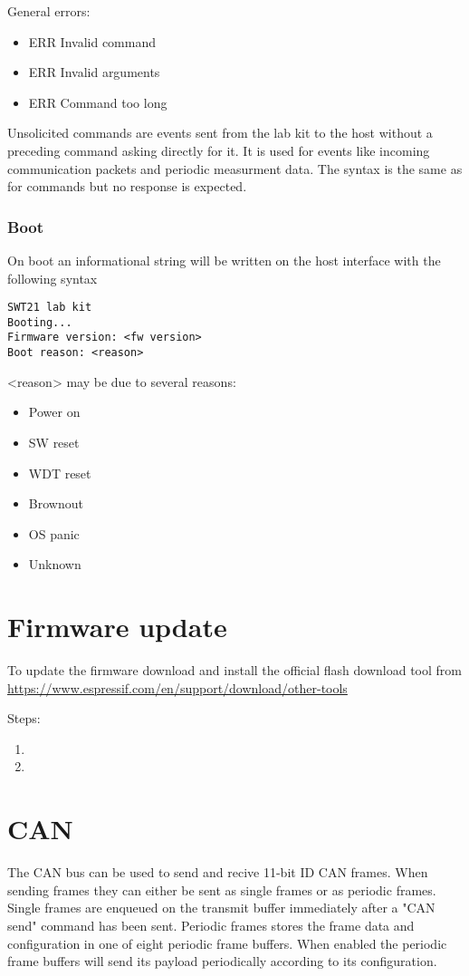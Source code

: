 \documentclass{article}[a4paper]
\begin{document}
General errors:
\begin{itemize}[noitemsep]
\item ERR Invalid command
\item ERR Invalid arguments
\item ERR Command too long
\end{itemize}

Unsolicited commands are events sent from the lab kit to the host without a
preceding command asking directly for it. It is used for events like incoming
communication packets and periodic measurment data. The syntax is the same as
for commands but no response is expected.

\subsubsection{Boot}
On boot an informational string will be written on the host interface with
the following syntax

\begin{verbatim}
SWT21 lab kit
Booting...
Firmware version: <fw version>
Boot reason: <reason>
\end{verbatim}

<reason> may be due to several reasons:
\begin{itemize}[noitemsep]
\item Power on
\item SW reset
\item WDT reset
\item Brownout
\item OS panic
\item Unknown
\end{itemize}

\section{Firmware update}
To update the firmware download and install the official flash download tool from
\url{https://www.espressif.com/en/support/download/other-tools}

Steps:
\begin{enumerate}
\item
\item
\end{enumerate}

\section{CAN}
The CAN bus can be used to send and recive 11-bit ID CAN frames.
When sending frames they can either be sent as single frames or as periodic
frames. Single frames are enqueued on the transmit buffer immediately after a
"CAN send" command has been sent. Periodic frames stores the frame data and
configuration in one
of eight periodic frame buffers. When enabled the periodic frame buffers will
send its payload periodically according to its configuration.
\end{document}
